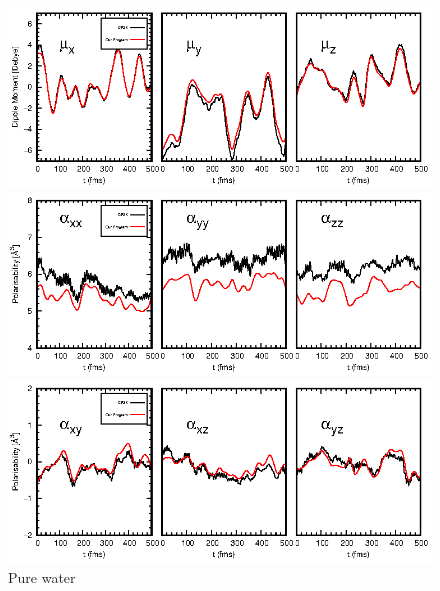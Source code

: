 \documentclass{article}
\begin{document}
\begin{figure}
\centering
\includegraphics[width=6.2in]{pure-water/Fig1.eps}

\includegraphics[width=6.2in]{pure-water/Fig2.eps}
    
\includegraphics[width=6.2in]{pure-water/Fig3.eps}
\caption{Pure water}
\end{figure}
\end{document}

